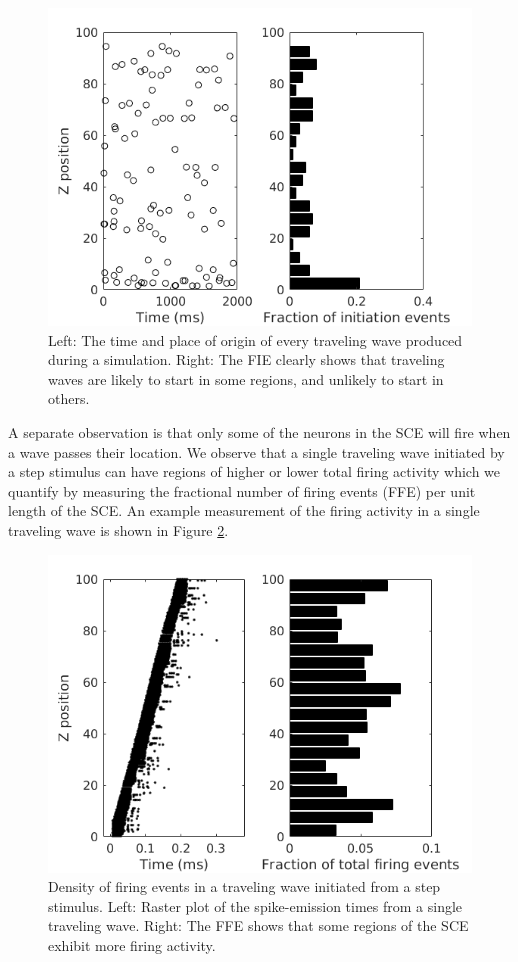 \begin{figure}[!htb]
 \centering
   \includegraphics[width=\textwidth]{fig/InitiationSites_100sims}
   \caption{Left: The time and place of origin of every traveling wave produced during a simulation. 
	  Right: The FIE clearly shows that traveling waves are likely to start in some regions, and unlikely to start in others.}
   \label{fig:wave_initiation_sites}
\end{figure}

A separate observation is that only some of the neurons in the SCE will fire when a wave passes their location.
We observe that a single traveling wave initiated by a step stimulus can have regions of higher or lower total firing activity which we quantify by measuring the fractional number of firing events (FFE) per unit length of the SCE.
An example measurement of the firing activity in a single traveling wave is shown in Figure \ref{fig:wave_density}.
\begin{figure}[!htb]
 \centering
   \includegraphics[width=\textwidth]{fig/ImpulseWaveDensity}
   \caption{Density of firing events in a traveling wave initiated from a step stimulus. 
	  Left: Raster plot of the spike-emission times from a single traveling wave. 
	  Right: The FFE shows that some regions of the SCE exhibit more firing activity.}
   \label{fig:wave_density}
\end{figure}

